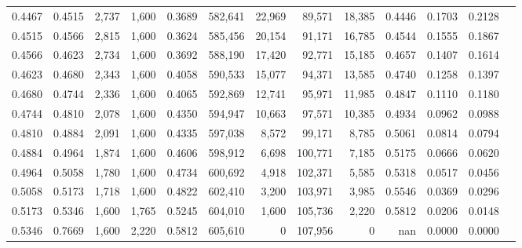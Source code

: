 \begin{tabular}{rrrrrrrrrrrrr}
0.4467 & 0.4515 &  2,737 & 1,600 &                                     0.3689 & 582,641 &  22,969 &  89,571 &  18,385 & 0.4446 & 0.1703 & 0.2128 \\
0.4515 & 0.4566 &  2,815 & 1,600 &                                     0.3624 & 585,456 &  20,154 &  91,171 &  16,785 & 0.4544 & 0.1555 & 0.1867 \\
0.4566 & 0.4623 &  2,734 & 1,600 &                                     0.3692 & 588,190 &  17,420 &  92,771 &  15,185 & 0.4657 & 0.1407 & 0.1614 \\
0.4623 & 0.4680 &  2,343 & 1,600 &                                     0.4058 & 590,533 &  15,077 &  94,371 &  13,585 & 0.4740 & 0.1258 & 0.1397 \\
0.4680 & 0.4744 &  2,336 & 1,600 &                                     0.4065 & 592,869 &  12,741 &  95,971 &  11,985 & 0.4847 & 0.1110 & 0.1180 \\
0.4744 & 0.4810 &  2,078 & 1,600 &                                     0.4350 & 594,947 &  10,663 &  97,571 &  10,385 & 0.4934 & 0.0962 & 0.0988 \\
0.4810 & 0.4884 &  2,091 & 1,600 &                                     0.4335 & 597,038 &   8,572 &  99,171 &   8,785 & 0.5061 & 0.0814 & 0.0794 \\
0.4884 & 0.4964 &  1,874 & 1,600 &                                     0.4606 & 598,912 &   6,698 & 100,771 &   7,185 & 0.5175 & 0.0666 & 0.0620 \\
0.4964 & 0.5058 &  1,780 & 1,600 &                                     0.4734 & 600,692 &   4,918 & 102,371 &   5,585 & 0.5318 & 0.0517 & 0.0456 \\
0.5058 & 0.5173 &  1,718 & 1,600 &                                     0.4822 & 602,410 &   3,200 & 103,971 &   3,985 & 0.5546 & 0.0369 & 0.0296 \\
0.5173 & 0.5346 &  1,600 & 1,765 &                                     0.5245 & 604,010 &   1,600 & 105,736 &   2,220 & 0.5812 & 0.0206 & 0.0148 \\
0.5346 & 0.7669 &  1,600 & 2,220 &                                     0.5812 & 605,610 &       0 & 107,956 &       0 &    nan & 0.0000 & 0.0000 \\
\bottomrule
\end{tabular}

